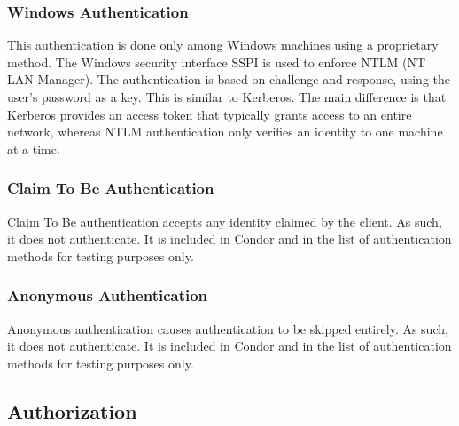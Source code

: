 \subsubsection{\label{sec:NTSSPI-Authentication}Windows Authentication}
This authentication is done only among Windows machines using
a proprietary method.
The Windows security interface SSPI is used to enforce NTLM
(NT LAN Manager).
The authentication is based on challenge and response, using the user's
password as a key.
This is similar to Kerberos.
The main difference 
is that Kerberos provides an access token that typically grants
access to an entire network, whereas NTLM authentication only 
verifies an identity to one machine at a time.

\subsubsection{\label{sec:CLAIM-Authentication}Claim To Be Authentication}
Claim To Be authentication accepts any identity claimed by the client.
As such, it does not authenticate.
It is included in Condor and in the list of authentication methods
for testing purposes only.

\subsubsection{\label{sec:ANON-Authentication}Anonymous Authentication}
Anonymous authentication causes authentication to be skipped entirely.
As such, it does not authenticate.
It is included in Condor and in the list of authentication methods
for testing purposes only.


\subsection{\label{sec:Security-Authorization}Authorization}

